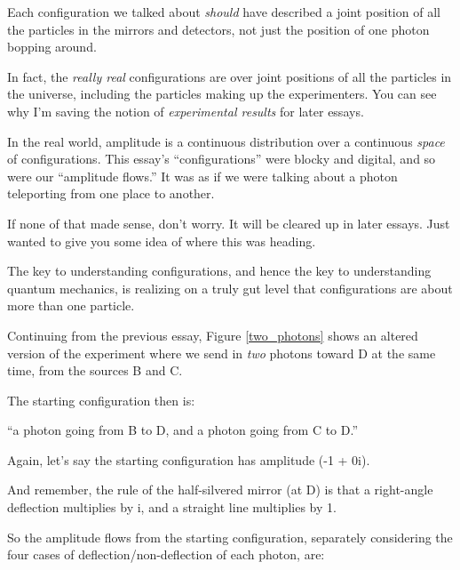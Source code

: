 {
 Each configuration we talked about \textit{should} have described
a joint position of all the particles in the mirrors and detectors, not
just the position of one photon bopping around.}

{
 In fact, the \textit{really real} configurations are over joint
positions of all the particles in the universe, including the particles
making up the experimenters. You can see why I'm saving
the notion of \textit{experimental results} for later essays.}

{
 In the real world, amplitude is a continuous distribution over a
continuous \textit{space} of configurations. This
essay's
``configurations'' were blocky and
digital, and so were our ``amplitude
flows.'' It was as if we were talking about a photon
teleporting from one place to another.}

{
 If none of that made sense, don't worry. It will
be cleared up in later essays. Just wanted to give you some idea of
where this was heading.}

\myendsectiontext


\bigskip


{
 The key to understanding configurations, and hence the key to
understanding quantum mechanics, is realizing on a truly gut level that
configurations are about more than one particle.}


{
 Continuing from the previous essay, Figure \ref{two_photons} shows an altered
version of the experiment where we send in \textit{two} photons toward
D at the same time, from the sources B and C.}

{
 The starting configuration then is:}

{
 ``a photon going from B to D,\newline
 and a photon going from C to D.''}

{
 Again, let's say the starting configuration has
amplitude (-1 + 0i).}

{
 And remember, the rule of the half-silvered mirror (at D) is that
a right-angle deflection multiplies by i, and a straight line
multiplies by 1.}

{
 So the amplitude flows from the starting configuration, separately
considering the four cases of deflection/non-deflection of each photon,
are:}

